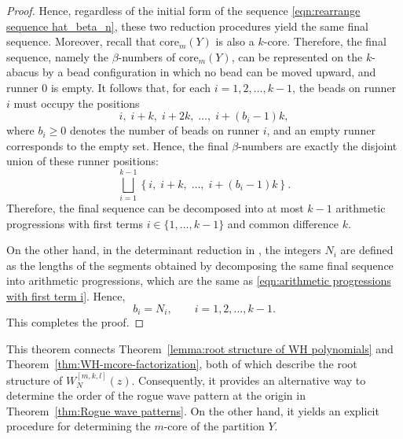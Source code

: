 \documentclass[preprint,3p,10pt]{elsarticle}
\theoremstyle{definition}
\begin{document}
\begin{proof}
Hence, regardless of the initial form of the sequence \eqref{eqn:rearrange sequence hat_beta_n}, these two reduction procedures yield the same final sequence. Moreover, recall that \(\mathrm{core}_m(Y)\) is also a \(k\)-core. Therefore, the final sequence, namely the \(\beta\)-numbers of \(\mathrm{core}_m(Y)\), can be represented on the \(k\)-abacus by a bead configuration in which no bead can be moved upward, and runner \(0\) is empty. It follows that, for each \(i=1,2,\ldots,k-1\), the beads on runner \(i\) must occupy the positions
\begin{equation}
    i,\; i+k,\; i+2k,\; \ldots,\; i+(b_i-1)k,
\end{equation}
where \(b_i\ge 0\) denotes the number of beads on runner \(i\), and an empty runner corresponds to the empty set. Hence, the final \(\beta\)-numbers are exactly the disjoint union of these runner positions:
\begin{equation}\label{eqn:arithmetic progressions with first term i}
    \bigsqcup_{i=1}^{k-1}
    \left\{
    i,\; i+k,\; \ldots,\; i+(b_i-1)k
    \right\}.
\end{equation}
Therefore, the final sequence can be decomposed into at most \(k-1\) arithmetic progressions with first terms \(i\in\{1,\ldots,k-1\}\) and common difference \(k\).


On the other hand, in the determinant reduction in \cite{lin2024rogue}, the integers \(N_i\) are defined as the lengths of the segments obtained by decomposing the same final sequence into arithmetic progressions, which are the same as \eqref{eqn:arithmetic progressions with first term i}.  Hence,
\begin{equation}
    b_i=N_i,\qquad i=1,2,\ldots,k-1.
\end{equation}
This completes the proof.

\end{proof}


This theorem connects Theorem~\ref{lemma:root structure of WH polynomials} and Theorem~\ref{thm:WH-mcore-factorization}, both of which describe the root structure of \(W_N^{[m,k,l]}(z)\). Consequently, it provides an alternative way to determine the order of the rogue wave pattern at the origin in Theorem~\ref{thm:Rogue wave patterns}. On the other hand, it yields an explicit procedure for determining the \(m\)-core of the partition \(Y\).
\end{document}
